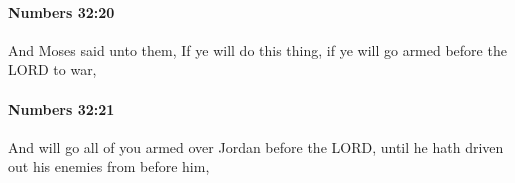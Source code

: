 		\paragraph{Numbers 32:20} %
			\label{NUMBERS-32-20}

			And Moses said unto them, If ye will do this thing, if ye will go armed before the LORD to war,


		\paragraph{Numbers 32:21} %
			\label{NUMBERS-32-21}

			And will go all of you armed over Jordan before the LORD, until he hath driven out his enemies from before him,


